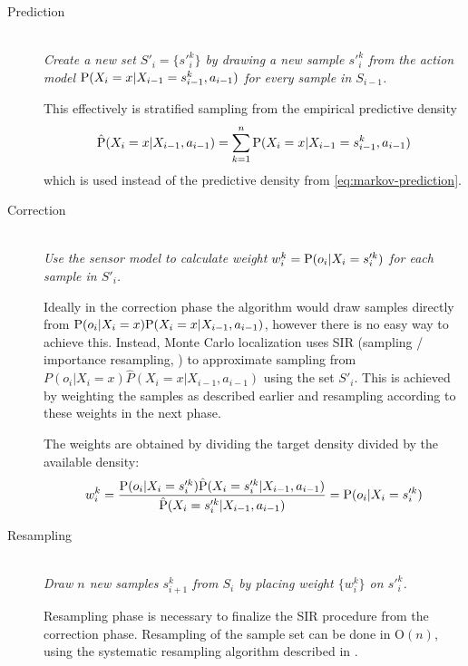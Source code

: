 \begin{description}
\item[Prediction] \hfill \\
	\emph{
	Create a new set \(S'_i = \{s'^k_{i}\} \)
	by drawing a new sample \(s'^k_{i}\)
	from the action model \(\P(X_i = x | X_{i-1} = s^k_{i-1}, a_{i - 1})\)
	for every sample in \(S_{i-1}\).
	}

	This effectively is stratified sampling from the empirical predictive density
	\begin{equation}
		\label{eq:mcl-predictive-density}
		\hat{\P}(X_i = x | X_{i - 1}, a_{i - 1}) =
		\sum_{k = 1}^n \P(X_i = x | X_{i-1} = s^k_{i-1}, a_{i - 1})
	\end{equation}
	which is used instead of the predictive density from \eqref{eq:markov-prediction}.

\item[Correction] \hfill \\
	\emph{
	Use the sensor model to calculate weight \(w^k_i = \P(o_i | X_i = s'^k_i)\)
	for each sample in \(S'_i\).
	}

	Ideally in the correction phase the algorithm would draw samples directly from
	\(\P(o_i | X_i = x) \P(X_i = x | X_{i - 1}, a_{i - 1})\),
	however there is no easy way to achieve this.
	Instead, Monte Carlo localization 
	uses SIR (sampling / importance resampling, \cite{smith92})
	to approximate sampling from
	\(P(o_i | X_i = x) \hat{P}(X_i = x | X_{i - 1}, a_{i - 1})\) using the set \(S'_i\).
	This is achieved by weighting the samples as described earlier and resampling
	according to these weights in the next phase.

	The weights are obtained by dividing the target density divided by the available density:
	\begin{equation}
		w^k_i = 
		\frac{
			\P(o_i | X_i = s'^k_i) \hat{\P}(X_i = s'^k_i | X_{i - 1}, a_{i - 1})
		}{
			\hat{\P}(X_i =  s'^k_i | X_{i - 1}, a_{i - 1})
		} = \P(o_i | X_i = s'^k_i)
	\end{equation}


\item[Resampling] \hfill \\
	\emph{
	Draw \(n\) new samples \(s^k_{i+1}\) from \(S_i\) by placing
	weight \(\{w^k_i\}\) on \(s'^k_{i}\).
	}

	Resampling phase is necessary to finalize the SIR procedure from the correction phase.
	Resampling of the sample set can be done in \(\mathrm{O}(n)\), using the systematic
	resampling algorithm described in \cite{arulampalam01}.
\end{description}

